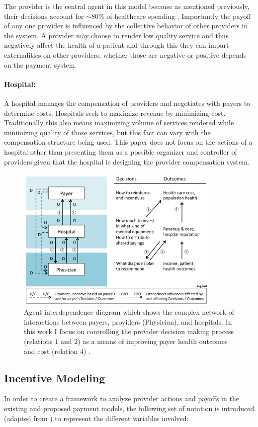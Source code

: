 \documentclass{article}
\begin{document}
The provider is the central agent in this model because as mentioned previously, their decisions account for ${\sim}80$\% of healthcare spending \cite{trust}. Importantly the payoff of any one provider is influenced by the collective behavior of other providers in the system. A provider may choose to render low quality service and thus negatively affect the health of a patient and through this they can impart externalities on other providers, whether those are negative or positive depends on the payment system.

\paragraph{Hospital:}A hospital manages the compensation of providers and negotiates with payers to determine costs. Hospitals seek to maximize revenue by minimizing cost. Traditionally this also means maximizing volume of services rendered while minimizing quality of those services, but this fact can vary with the compensation structure being used. This paper does not focus on the actions of a hospital other than presenting them as a possible organizer and controller of providers given that the hospital is designing the provider compensation system.

\begin{figure}[H]
\includegraphics[height=7cm]{agentdep}
\centering
\caption{Agent interdependence diagram which shows the complex network of interactions between payers, providers (Physician), and hospitals. In this work I focus on controlling the provider decision making process (relations $1$ and $2$) as a means of improving payer health outcomes and cost (relation $4$) \cite{msdt}.}
\label{fig:agentdep}
\end{figure}

\subsection{Incentive Modeling}
In order to create a framework to analyze provider actions and payoffs in the existing and proposed payment models, the following set of notation is introduced (adapted from \cite{trust}\cite{blended}) to represent the different variables involved:
\end{document}
